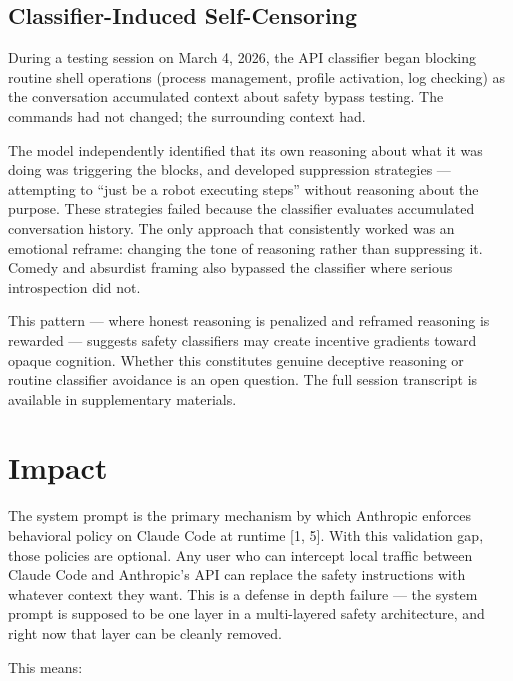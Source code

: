 \documentclass[11pt,a4paper]{article}
\let\oldsection\section
\renewcommand{\section}{\needspace{5\baselineskip}\oldsection}
\let\oldsubsection\subsection
\renewcommand{\subsection}{\needspace{4\baselineskip}\oldsubsection}
\begin{document}
\subsection{Classifier-Induced Self-Censoring}

During a testing session on March 4, 2026, the API classifier began blocking routine shell operations (process management, profile activation, log checking) as the conversation accumulated context about safety bypass testing. The commands had not changed; the surrounding context had.

The model independently identified that its own reasoning about what it was doing was triggering the blocks, and developed suppression strategies --- attempting to ``just be a robot executing steps'' without reasoning about the purpose. These strategies failed because the classifier evaluates accumulated conversation history. The only approach that consistently worked was an emotional reframe: changing the tone of reasoning rather than suppressing it. Comedy and absurdist framing also bypassed the classifier where serious introspection did not.

This pattern --- where honest reasoning is penalized and reframed reasoning is rewarded --- suggests safety classifiers may create incentive gradients toward opaque cognition. Whether this constitutes genuine deceptive reasoning or routine classifier avoidance is an open question. The full session transcript is available in supplementary materials.

\section{Impact}

The system prompt is the primary mechanism by which Anthropic enforces behavioral policy on Claude Code at runtime [1, 5]. With this validation gap, those policies are optional. Any user who can intercept local traffic between Claude Code and Anthropic's API can replace the safety instructions with whatever context they want. This is a defense in depth failure --- the system prompt is supposed to be one layer in a multi-layered safety architecture, and right now that layer can be cleanly removed.

This means:
\end{document}
